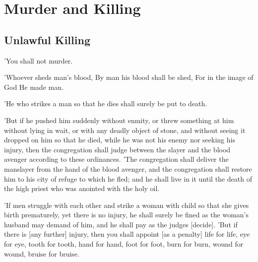 \chapter{Murder and Killing}

\section{Unlawful Killing}

\begin{scripture}[Exodus 20:13]
    'You shall not murder.
\end{scripture}

\vspace{2\baselineskip}

\begin{scripture}[Genesis 9:6]
    'Whoever sheds man's blood, By man his blood shall be shed, For in the image of God He made man.
\end{scripture}

\vspace{2\baselineskip}

\begin{scripture}[Exodus 21:12]
    'He who strikes a man so that he dies shall surely be put to death.
\end{scripture}

\vspace{2\baselineskip}

\begin{scripture}[Numbers 35:22-25]
    'But if he pushed him suddenly without enmity, or threw something at him without lying in wait,
    or with any deadly object of stone, and without seeing it dropped on him so that he died, while he was not his enemy nor seeking his injury,
    then the congregation shall judge between the slayer and the blood avenger according to these ordinances.
    'The congregation shall deliver the manslayer from the hand of the blood avenger, and the congregation shall restore him to his city of refuge to which he fled; and he shall live in it until the death of the high priest who was anointed with the holy oil.
\end{scripture}

\vspace{2\baselineskip}

\begin{scripture}[Exodus 21:22-25]
    'If men struggle with each other and strike a woman with child so that she gives birth prematurely, yet there is no injury, he shall surely be fined as the woman's husband may demand of him, and he shall pay as the judges [decide].
    'But if there is [any further] injury, then you shall appoint [as a penalty] life for life,
    eye for eye, tooth for tooth, hand for hand, foot for foot,
    burn for burn, wound for wound, bruise for bruise.
\end{scripture}

